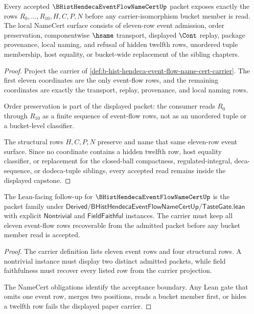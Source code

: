 \begin{theorem}
\label{thm:b-hist-hendeca-event-flow-name-cert-obligations}
Every accepted $\BHistHendecaEventFlowNameCertUp$ packet exposes exactly the rows $R_0,\ldots,R_{10},H,C,P,N$ before any carrier-isomorphism bucket member is read. The local NameCert surface consists of eleven-row event admission, order preservation, componentwise $\hsame$ transport, displayed $\Cont$ replay, package provenance, local naming, and refusal of hidden twelfth rows, unordered tuple membership, host equality, or bucket-wide replacement of the sibling chapters.
\end{theorem}
\begin{proof}
Project the carrier of \autoref{def:b-hist-hendeca-event-flow-name-cert-carrier}. The first eleven coordinates are the only event-flow rows, and the remaining coordinates are exactly the transport, replay, provenance, and local naming rows.

Order preservation is part of the displayed packet: the consumer reads $R_0$ through $R_{10}$ as a finite sequence of event-flow rows, not as an unordered tuple or a bucket-level classifier.

The structural rows $H,C,P,N$ preserve and name that same eleven-row event surface. Since no coordinate contains a hidden twelfth row, host equality classifier, or replacement for the closed-ball compactness, regulated-integral, deca-sequence, or dodeca-tuple siblings, every accepted read remains inside the displayed capstone.
\end{proof}

\begin{theorem}
\label{thm:b-hist-hendeca-event-flow-name-cert-tastegate-follow-up}
The Lean-facing follow-up for $\BHistHendecaEventFlowNameCertUp$ is the packet family under $\mathsf{Derived/BHistHendecaEventFlowNameCertUp/TasteGate.lean}$ with explicit $\mathsf{Nontrivial}$ and $\mathsf{FieldFaithful}$ instances. The carrier must keep all eleven event-flow rows recoverable from the admitted packet before any bucket member read is accepted.
\end{theorem}
\begin{proof}
The carrier definition lists eleven event rows and four structural rows. A nontrivial instance must display two distinct admitted packets, while field faithfulness must recover every listed row from the carrier projection.

The NameCert obligations identify the acceptance boundary. Any Lean gate that omits one event row, merges two positions, reads a bucket member first, or hides a twelfth row fails the displayed paper carrier.
\end{proof}

